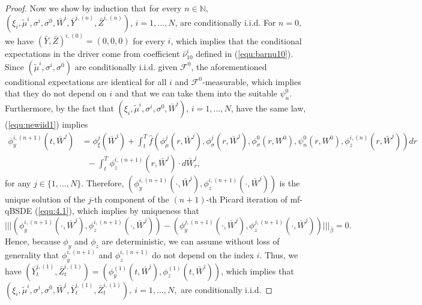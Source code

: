 \documentclass[10pt,a4paper]{article}
\newcommand{\be}{\begin{equation}}
\newcommand{\ee}{\end{equation}}
\newcommand{\MF}{{\mathcal{F}}}
\theoremstyle{plain}
\theoremstyle{definition}
\numberwithin{equation}{section}
\newcommand{\trinm}[1]{\vert\!\vert\!\vert #1 \vert\!\vert\!\vert}
\begin{document}
\begin{proof}
Now we show by induction that for every $n \in \mathbb{N}$,
$(\xi_{i},\tilde \mu^i, \sigma^i, \sigma^0, \bar{W}^i,   \bar{Y}^{i,(n)},\bar{Z}^{i,(n)})$, $i=1,...,N$, are conditionally i.i.d. For $n=0$, we have $(\bar{Y},  \bar{Z})^{i,(0)} = (0,0,0)$ for every $i$, which implies that
the conditional expectations in the driver come from coefficient $\bar{\nu}_{10}^{i}$ defined in (\ref{equ:barnu10}). Since $(\tilde{\mu}^{i},\sigma^{i}, \sigma^0)$ are conditionally i.i.d. given $\MF^0$, the aforementioned conditional expectations are identical for all $i$ and $\mathcal{F}^{0}$-measurable, which implies that they do not depend on $i$ and that we can take them into the suitable $\psi_{n}^{0}$. Furthermore, by the fact that $(\xi_i, \tilde \mu^i, \sigma^i, \sigma^0, \bar{W}^i)$, $i=1,...,N$, have the same law, (\ref{equ:newiid1}) implies
\be
\begin{split}
\phi_{y}^{i,(n+1)}(t,\bar W^j) &= \phi_\xi^j(\bar{W}^{j}) + \int_{t}^{T}\hat{f}(\phi_{\mu}^j (r,\bar W^j) ,\phi_{\sigma}^j(r,\bar W^j) ,\phi_{\sigma}^{0}(r, W^0),\psi_{n}^{0}(r,W^{0}),\phi_{z}^{i,(n)}(r,\bar W^j) ) dr  \\
&\ \ \ - \int_{t}^{T}\phi_{z}^{i,(n+1)}(r,\bar W^j) \cdot d \bar{W}^j_r, \label{equ:newiid2}   
\end{split}
\ee
for any $j \in \{1,...,N\}$. Therefore, $(\phi_{y}^{i,(n+1)}(\cdot,\bar{W}^j),\phi_{z}^{i,(n+1)}(\cdot,\bar{W}^j))$ is the unique solution of the $j$-th component of the $(n+1)$-th Picard iteration of mf-qBSDE (\ref{equ:4.1}), which implies by uniqueness that
\[
\trinm{(\phi_{y}^{i,(n+1)}(\cdot,\bar{W}^j),\phi_{z}^{i,(n+1)}(\cdot,\bar{W}^j))-(\phi_{y}^{j,(n+1)}(\cdot,\bar{W}^j),\phi_{z}^{j,(n+1)}(\cdot,\bar{W}^j))}_{\bar\beta} = 0.
\]
Hence, because $\phi_{y}$ and $\phi_{z}$ are deterministic, we can assume without loss of generality that $\phi_{y}^{i,(n+1)}$ and $\phi_{z}^{i,(n+1)}$ do not depend on the index $i$. Thus, we have $(\bar{Y}_{t}^{i,(1)},\bar{Z}_{t}^{i,(1)}) = (\phi_{y}^{(1)}(t,\bar{W}^{i}),\phi_{z}^{(1)}(t,\bar{W}^{i}))$, which implies that $(\xi_{i},\tilde \mu^i, \sigma^i, \sigma^0,  \bar W^i,   \bar{Y}_{t}^{i,(1)},\bar{Z}_{t}^{i,(1)}),\ i=1,...,N,$ are conditionally i.i.d. 



\end{proof}
\end{document}
